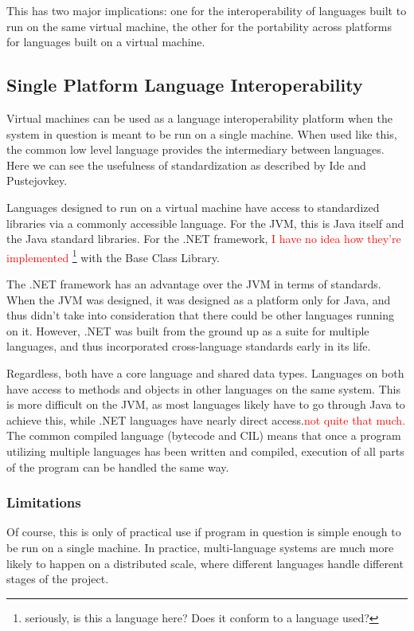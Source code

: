 \documentclass{sig-alternate}
\newcommand{\mycomment}[1]{\textcolor{red}{#1}}
\begin{document}
This has two major implications: one for the interoperability of languages built to run on the same virtual machine, the other for the portability across platforms for languages built on a virtual machine.

\subsection*{Single Platform Language Interoperability}
Virtual machines can be used as a language interoperability platform when the system in question is meant to be run on a single machine. When used like this, the common low level language provides the intermediary between languages. Here we can see the usefulness of standardization as described by Ide and Pustejovkey\cite{Ide:2010}.

Languages designed to run on a virtual machine have access to standardized libraries via a commonly accessible language. For the JVM, this is Java itself and the Java standard libraries. For the .NET framework, \mycomment{I have no idea how they're implemented \footnote{seriously, is this a language here? Does it conform to a language used?}} with the Base Class Library. 

The .NET framework has an advantage over the JVM in terms of standards. When the JVM was designed, it was designed as a platform only for Java, and thus didn't take into consideration that there could be other languages running on it. However, .NET was built from the ground up as a suite for multiple languages, and thus incorporated cross-language standards early in its life.

Regardless, both have a core language and shared data types. Languages on both have access to methods and objects in other languages on the same system. This is more difficult on the JVM, as most languages likely have to go through Java to achieve this, while .NET languages have nearly direct access.\mycomment{not quite that much.} The common compiled language (bytecode and CIL) means that once a program utilizing multiple languages has been written and compiled, execution of all parts of the program can be handled the same way.

\subsubsection*{Limitations}
Of course, this is only of practical use if program in question is simple enough to be run on a single machine. In practice, multi-language systems are much more likely to happen on a distributed scale, where different languages handle different stages of the project.
\end{document}

